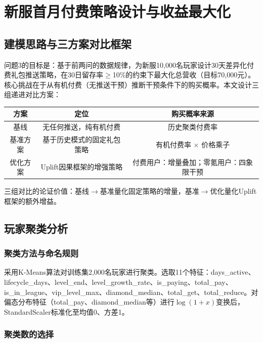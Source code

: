 \section{新服首月付费策略设计与收益最大化}

\subsection{建模思路与三方案对比框架}

问题3的目标是：基于前两问的数据规律，为新服10,000名玩家设计30天差异化付费礼包推送策略，在30日留存率$\geq$10\%的约束下最大化总营收（目标70,000元）。核心挑战在于从有机付费（无推送干预）推断干预条件下的购买概率。本文设计三组递进对比方案：

\begin{center}
\begin{tabular}{c|c|c}
\toprule
\textbf{方案} & \textbf{定位} & \textbf{购买概率来源} \\
\midrule
基线 & 无任何推送，纯有机付费 & 历史聚类付费率 \\
基准方案 & 基于历史模式的固定礼包策略 & 有机付费率 $\times$ 价格乘子 \\
优化方案 & Uplift因果框架的增强策略 & 付费用户：增量叠加；零氪用户：四象限干预 \\
\bottomrule
\end{tabular}
\end{center}

三组对比的论证价值：基线$\to$基准量化固定策略的增量，基准$\to$优化量化Uplift框架的额外增益。

\subsection{玩家聚类分析}

\subsubsection{聚类方法与命名规则}

采用K-Means算法\cite{macqueen1967}对训练集2,000名玩家进行聚类。选取11个特征：days\_active、lifecycle\_days、level\_end、level\_growth\_rate、is\_paying、total\_pay、is\_in\_league、vip\_level\_max、diamond\_median、total\_get、total\_reduce。对偏态分布特征（total\_pay、diamond\_median等）进行$\log(1+x)$变换后，StandardScaler标准化至均值0、方差1。

\subsubsection{聚类数的选择}

